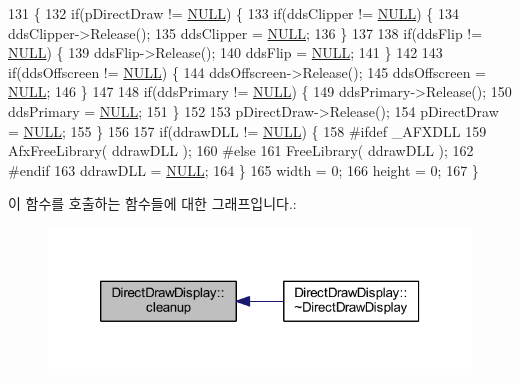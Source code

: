 \begin{DoxyCode}
131 \{
132   \textcolor{keywordflow}{if}(pDirectDraw != \mbox{\hyperlink{getopt1_8c_a070d2ce7b6bb7e5c05602aa8c308d0c4}{NULL}}) \{
133     \textcolor{keywordflow}{if}(ddsClipper != \mbox{\hyperlink{getopt1_8c_a070d2ce7b6bb7e5c05602aa8c308d0c4}{NULL}}) \{
134       ddsClipper->Release();
135       ddsClipper = \mbox{\hyperlink{getopt1_8c_a070d2ce7b6bb7e5c05602aa8c308d0c4}{NULL}};
136     \}
137 
138     \textcolor{keywordflow}{if}(ddsFlip != \mbox{\hyperlink{getopt1_8c_a070d2ce7b6bb7e5c05602aa8c308d0c4}{NULL}}) \{
139       ddsFlip->Release();
140       ddsFlip = \mbox{\hyperlink{getopt1_8c_a070d2ce7b6bb7e5c05602aa8c308d0c4}{NULL}};
141     \}
142 
143     \textcolor{keywordflow}{if}(ddsOffscreen != \mbox{\hyperlink{getopt1_8c_a070d2ce7b6bb7e5c05602aa8c308d0c4}{NULL}}) \{
144       ddsOffscreen->Release();
145       ddsOffscreen = \mbox{\hyperlink{getopt1_8c_a070d2ce7b6bb7e5c05602aa8c308d0c4}{NULL}};
146     \}
147     
148     \textcolor{keywordflow}{if}(ddsPrimary != \mbox{\hyperlink{getopt1_8c_a070d2ce7b6bb7e5c05602aa8c308d0c4}{NULL}}) \{
149       ddsPrimary->Release();
150       ddsPrimary = \mbox{\hyperlink{getopt1_8c_a070d2ce7b6bb7e5c05602aa8c308d0c4}{NULL}};
151     \}
152     
153     pDirectDraw->Release();
154     pDirectDraw = \mbox{\hyperlink{getopt1_8c_a070d2ce7b6bb7e5c05602aa8c308d0c4}{NULL}};
155   \}
156 
157   \textcolor{keywordflow}{if}(ddrawDLL != \mbox{\hyperlink{getopt1_8c_a070d2ce7b6bb7e5c05602aa8c308d0c4}{NULL}}) \{
158 \textcolor{preprocessor}{#ifdef \_AFXDLL}
159     AfxFreeLibrary( ddrawDLL );
160 \textcolor{preprocessor}{#else}
161     FreeLibrary( ddrawDLL );
162 \textcolor{preprocessor}{#endif}
163     ddrawDLL = \mbox{\hyperlink{getopt1_8c_a070d2ce7b6bb7e5c05602aa8c308d0c4}{NULL}};
164   \}
165   width = 0;
166   height = 0;
167 \}
\end{DoxyCode}
이 함수를 호출하는 함수들에 대한 그래프입니다.\+:
\nopagebreak
\begin{figure}[H]
\begin{center}
\leavevmode
\includegraphics[width=320pt]{class_direct_draw_display_a9ef5e33d516c118742d7cf3b52ed28fc_icgraph}
\end{center}
\end{figure}
\mbox{\label{class_direct_draw_display_a90c0576a1ad6b80c1377df94d4eaa1a2}} 
